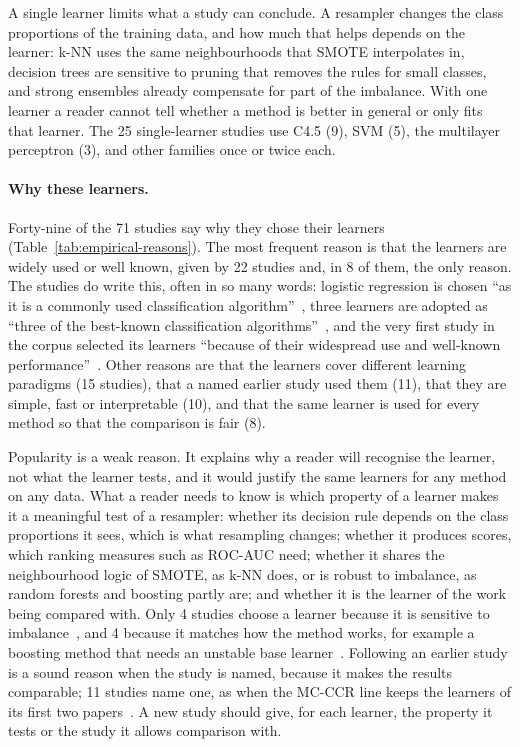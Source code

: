 

A single learner limits what a study can conclude. A resampler changes the class proportions of the training data, and how much that helps depends on the learner: k-NN uses the same neighbourhoods that SMOTE interpolates in, decision trees are sensitive to pruning that removes the rules for small classes, and strong ensembles already compensate for part of the imbalance. With one learner a reader cannot tell whether a method is better in general or only fits that learner. The 25 single-learner studies use C4.5 (9), SVM (5), the multilayer perceptron (3), and other families once or twice each.

\paragraph{Why these learners.} Forty-nine of the 71 studies say why they chose their learners (Table~\ref{tab:empirical-reasons}). The most frequent reason is that the learners are widely used or well known, given by 22 studies and, in 8 of them, the only reason. The studies do write this, often in so many words: logistic regression is chosen ``as it is a commonly used classification algorithm''~\parencite{liu2020mbs}, three learners are adopted as ``three of the best-known classification algorithms''~\parencite{zheng2022shsampler}, and the very first study in the corpus selected its learners ``because of their widespread use and well-known performance''~\parencite{kubat1997oss}. Other reasons are that the learners cover different learning paradigms (15 studies), that a named earlier study used them (11), that they are simple, fast or interpretable (10), and that the same learner is used for every method so that the comparison is fair (8).

Popularity is a weak reason. It explains why a reader will recognise the learner, not what the learner tests, and it would justify the same learners for any method on any data. What a reader needs to know is which property of a learner makes it a meaningful test of a resampler: whether its decision rule depends on the class proportions it sees, which is what resampling changes; whether it produces scores, which ranking measures such as ROC-AUC need; whether it shares the neighbourhood logic of SMOTE, as k-NN does, or is robust to imbalance, as random forests and boosting partly are; and whether it is the learner of the work being compared with. Only 4 studies choose a learner because it is sensitive to imbalance~\parencite{napierala2010spider2,saez2015smoteipf,yan2025gdhs,tao2025mcnclwo}, and 4 because it matches how the method works, for example a boosting method that needs an unstable base learner~\parencite{diezpastor2015randombalance}. Following an earlier study is a sound reason when the study is named, because it makes the results comparable; 11 studies name one, as when the MC-CCR line keeps the learners of its first two papers~\parencite{liu2023nromm}. A new study should give, for each learner, the property it tests or the study it allows comparison with.

